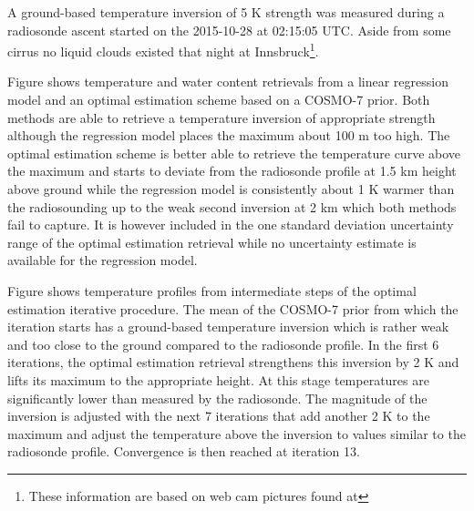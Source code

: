 \startsubsection[title={Ground-based Temperature Inversion},reference={ch:gbinv}]

    A ground-based temperature inversion of 5 K strength was measured during a
    radiosonde ascent started on the 2015-10-28 at 02:15:05 UTC. Aside from
    some cirrus no liquid clouds existed that night at Innsbruck\footnote{These
    information are based on web cam pictures found at
    }.

        {}

    Figure  shows temperature and water content retrievals
    from a linear regression model and an optimal estimation scheme based on
    a COSMO-7 prior. Both methods are able to retrieve a temperature inversion
    of appropriate strength although the regression model places the maximum
    about 100 m too high. The optimal estimation scheme is better able to
    retrieve the temperature curve above the maximum and starts to deviate from
    the radiosonde profile at 1.5 km height above ground while the regression
    model is consistently about 1 K warmer than the radiosounding up to the
    weak second inversion at 2 km which both methods fail to capture. It is
    however included in the one standard deviation uncertainty range of the
    optimal estimation retrieval while no uncertainty estimate is available
    for the regression model.

    Figure  shows temperature profiles from intermediate
    steps of the optimal estimation iterative procedure. The mean of the
    COSMO-7 prior from which the iteration starts has a ground-based
    temperature inversion which is rather weak and too close to the ground
    compared to the radiosonde profile. In the first 6 iterations, the optimal
    estimation retrieval strengthens this inversion by 2 K and
    lifts its maximum to the appropriate height. At this stage temperatures
    are significantly lower than measured by the radiosonde. The magnitude
    of the inversion is adjusted with the next 7 iterations that add another
    2 K to the maximum and adjust the temperature above the inversion to
    values similar to the radiosonde profile. Convergence is then reached at
    iteration 13.

